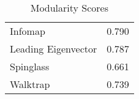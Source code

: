 \begin{table}[!h]

\caption{Modularity Scores}
\centering
\begin{tabular}[t]{lr}
\toprule
Infomap & 0.790\\
Leading Eigenvector & 0.787\\
Spinglass & 0.661\\
Walktrap & 0.739\\
\bottomrule
\end{tabular}
\end{table}
